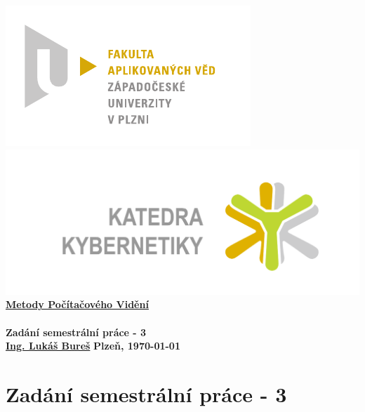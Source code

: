 \documentclass[12pt, a4paper]{article}
\newcommand{\cisloZadani}{Zadání semestrální práce - 3}
\begin{document}
 









 
\begin{titlepage}
\begin{center}
	\includegraphics[trim = 0.6cm 0.5cm 0.9cm 0.5cm, scale=1]{./FAV_logo_cz.pdf}
	\hspace*{\fill}
	\includegraphics[trim = 3.5cm 1.5cm 2.6cm 2cm, scale=0.295]{./KKY_logo_cz.pdf}\\
	\vspace*{\fill}
	\textbf{\Huge{\href{http://www.kky.zcu.cz/cs/courses/mpv}{Metody Počítačového Vidění} \\ ~ \\ \cisloZadani}}\\
	\vspace*{\fill}
	\textbf{\large{\href{mailto:LBures@kky.zcu.cz}{Ing. Lukáš Bureš}}} \hfill \textbf{\large{Plzeň, \today}}
\end{center}
\end{titlepage}








\section*{\cisloZadani}
\end{document}
